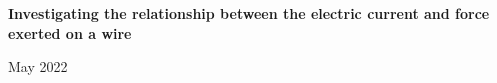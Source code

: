 \documentclass[11pt]{article}
\begin{document}
	\begin{center}
		\textbf{\Large Investigating the relationship between the electric current and force exerted on a wire}

		\vspace*{8pt}

		May 2022
	\end{center}

    

	

	

	

	

	

	\newpage

	\printbibliography[
		heading=bibintoc,
		title={Bibliography}
	]
	
	\vfill
	
\end{document}
